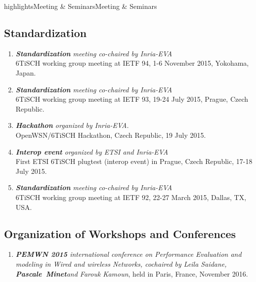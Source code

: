 \documentclass{ra2016}
\newcommand{\pascale} {\textbf{Pascale~Minet}}
\begin{document}
\begin{module}{highlights}{Meeting \& Seminars}{Meeting \& Seminars}
\begin{enumerate}
\end{enumerate}

\subsection{Standardization}
\begin{enumerate}
    \item \textit{\textbf{Standardization} meeting co-chaired by Inria-EVA}\\
        6TiSCH working group meeting at IETF 94, 1-6 November 2015, Yokohama, Japan.
    \item \textit{\textbf{Standardization} meeting co-chaired by Inria-EVA}\\
        6TiSCH working group meeting at IETF 93, 19-24 July 2015, Prague, Czech Republic.
    \item \textit{\textbf{Hackathon} organized by Inria-EVA.}\\
        OpenWSN/6TiSCH Hackathon, Czech Republic, 19 July 2015.
    \item \textit{\textbf{Interop event} organized by ETSI and Inria-EVA}\\
        First ETSI 6TiSCH plugtest (interop event) in Prague, Czech Republic, 17-18 July 2015.
    \item \textit{\textbf{Standardization} meeting co-chaired by Inria-EVA}\\
        6TiSCH working group meeting at IETF 92, 22-27 March 2015, Dallas, TX, USA.        
\end{enumerate}

\subsection{Organization of Workshops and Conferences}
\begin{enumerate}
    \item \textit{\textbf{PEMWN 2015} international conference on Performance Evaluation and modeling in Wired and wireless Networks, cochaired by Leila Saidane, \pascale and Farouk Kamoun}, held in Paris, France, November 2016.


\end{enumerate}
\end{module}
\end{document}
